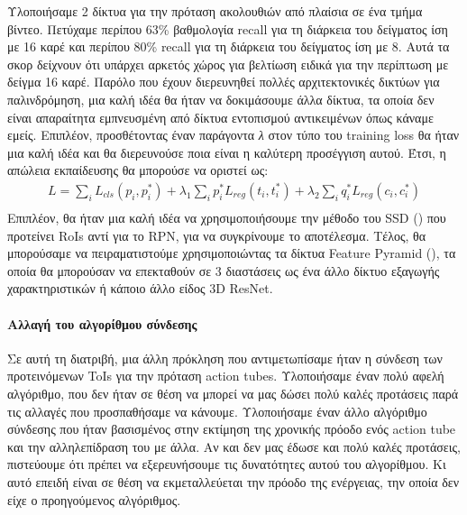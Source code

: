 Υλοποιήσαμε 2 δίκτυα για την πρόταση ακολουθιών από πλαίσια σε ένα τμήμα βίντεο. Πετύχαμε περίπου 63\% βαθμολογία \en recall \gr
για τη διάρκεια του δείγματος ίση με 16 καρέ και περίπου 80\% \en recall \gr για τη διάρκεια του δείγματος ίση με 8. Αυτά τα σκορ 
δείχνουν ότι υπάρχει αρκετός χώρος για βελτίωση ειδικά για την περίπτωση με δείγμα 16 καρέ.
Παρόλο που έχουν διερευνηθεί πολλές αρχιτεκτονικές δικτύων για
παλινδρόμηση, μια καλή ιδέα θα ήταν να δοκιμάσουμε άλλα δίκτυα, τα οποία δεν είναι απαραίτητα εμπνευσμένη
από δίκτυα εντοπισμού αντικειμένων όπως κάναμε εμείς. 
Επιπλέον, προσθέτοντας έναν παράγοντα \textit{λ} στον τύπο του \en training loss \gr
 θα ήταν μια καλή ιδέα και θα διερευνούσε ποια είναι η καλύτερη προσέγγιση αυτού.
Έτσι, η απώλεια εκπαίδευσης θα μπορούσε να οριστεί ως:
\begin{equation} 
\begin{split}
 L  =  \sum_iL_{cls}(p_i, p_i^*) + \lambda_1 \sum_ip_i^*L_{reg}(t_i,t_i^*) + \lambda_2  \sum_iq_i^*L_{reg}(c_{i}, c_{i}^*) \\
\end{split}
\end{equation}
Επιπλέον, θα ήταν μια καλή ιδέα να χρησιμοποιήσουμε την μέθοδο του \en SSD  (\cite{DBLP:journals/corr/LiuAESR15}) \gr που προτείνει \en RoIs \gr 
αντί για το \en RPN\gr, για να συγκρίνουμε το αποτέλεσμα.  Τέλος, θα μπορούσαμε να πειραματιστούμε χρησιμοποιώντας τα δίκτυα \en Feature Pyramid (\cite{8099589}), \gr
τα οποία θα μπορούσαν να επεκταθούν σε 3 διαστάσεις ως ένα άλλο δίκτυο εξαγωγής χαρακτηριστικών ή κάποιο άλλο είδος \en 3D ResNet\gr.

\paragraph{Αλλαγή του αλγορίθμου σύνδεσης}
Σε αυτή τη διατριβή, μια άλλη πρόκληση που αντιμετωπίσαμε ήταν η σύνδεση των προτεινόμενων \en ToIs \gr για την πρόταση \en action tubes\gr. Υλοποιήσαμε έναν πολύ αφελή αλγόριθμο,
που δεν ήταν σε θέση να μπορεί να μας δώσει πολύ καλές προτάσεις παρά τις αλλαγές που προσπαθήσαμε να κάνουμε. Υλοποιήσαμε έναν άλλο αλγόριθμο σύνδεσης που ήταν βασισμένος στην εκτίμηση της χρονικής
πρόοδο ενός \en action tube \gr και την αλληλεπίδραση του με άλλα. Αν και δεν μας έδωσε και πολύ καλές προτάσεις, πιστεύουμε ότι πρέπει να εξερευνήσουμε τις δυνατότητες αυτού του αλγορίθμου. Κι αυτό 
επειδή είναι σε θέση να   εκμεταλλεύεται την πρόοδο της ενέργειας, την οποία δεν είχε ο προηγούμενος αλγόριθμος.

